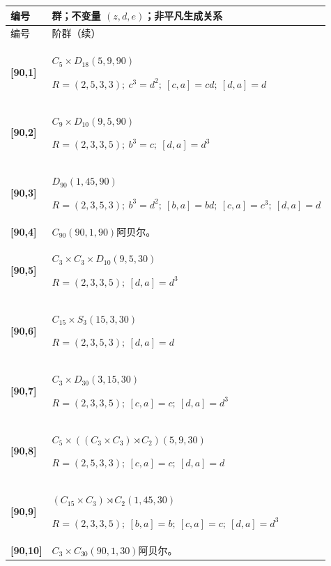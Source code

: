 \documentclass[UTF8,fontset=fandol,11pt,a4paper]{ctexart}
\begin{document}
\begin{longtable}{@{}p{17mm}>{\raggedright\arraybackslash}p{141mm}@{}}

\toprule 编号 & 群；不变量 $(z,d,e)$；非平凡生成关系\\\midrule\endfirsthead

\toprule 编号 & 90 阶群（续）\\\midrule\endhead\bottomrule\endfoot

\textbf{[90,1]} & $C_{5}\times D_{18}$\quad $(5,9,90)$\par\(R=(2,5,3,3);\allowbreak\ c^{3}=d^{2};\allowbreak\ [c,a]=cd;\allowbreak\ [d,a]=d\)\\[3pt]

\textbf{[90,2]} & $C_{9}\times D_{10}$\quad $(9,5,90)$\par\(R=(2,3,3,5);\allowbreak\ b^{3}=c;\allowbreak\ [d,a]=d^{3}\)\\[3pt]

\textbf{[90,3]} & $D_{90}$\quad $(1,45,90)$\par\(R=(2,3,5,3);\allowbreak\ b^{3}=d^{2};\allowbreak\ [b,a]=bd;\allowbreak\ [c,a]=c^{3};\allowbreak\ [d,a]=d\)\\[3pt]

\textbf{[90,4]} & $C_{90}$\quad $(90,1,90)$\quad 阿贝尔。\\[3pt]

\textbf{[90,5]} & $C_{3}\times C_{3}\times D_{10}$\quad $(9,5,30)$\par\(R=(2,3,3,5);\allowbreak\ [d,a]=d^{3}\)\\[3pt]

\textbf{[90,6]} & $C_{15}\times S_{3}$\quad $(15,3,30)$\par\(R=(2,3,5,3);\allowbreak\ [d,a]=d\)\\[3pt]

\textbf{[90,7]} & $C_{3}\times D_{30}$\quad $(3,15,30)$\par\(R=(2,3,3,5);\allowbreak\ [c,a]=c;\allowbreak\ [d,a]=d^{3}\)\\[3pt]

\textbf{[90,8]} & $C_{5}\times ((C_{3}\times C_{3})\rtimes C_{2})$\quad $(5,9,30)$\par\(R=(2,5,3,3);\allowbreak\ [c,a]=c;\allowbreak\ [d,a]=d\)\\[3pt]

\textbf{[90,9]} & $(C_{15}\times C_{3})\rtimes C_{2}$\quad $(1,45,30)$\par\(R=(2,3,3,5);\allowbreak\ [b,a]=b;\allowbreak\ [c,a]=c;\allowbreak\ [d,a]=d^{3}\)\\[3pt]

\textbf{[90,10]} & $C_{3}\times C_{30}$\quad $(90,1,30)$\quad 阿贝尔。\\[3pt]

\end{longtable}\endgroup
\end{document}
